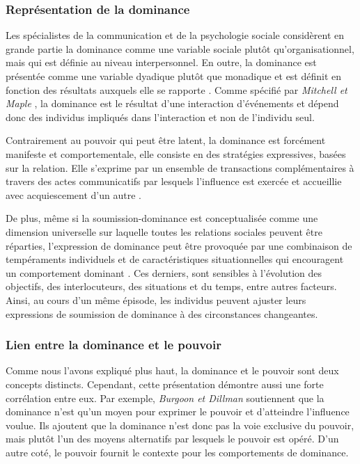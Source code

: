 		\subsubsection{Représentation de la dominance}
		
		Les spécialistes de la communication et de la psychologie sociale considèrent en grande partie la dominance comme une variable sociale plutôt qu'organisationnel, mais qui est définie au niveau interpersonnel. En outre, la dominance est présentée comme une variable dyadique plutôt que monadique et est définit en fonction des résultats auxquels elle se rapporte  \cite{burgoon1998nature,burgoon2006nonverbal}.
		Comme spécifié par \emph{Mitchell et Maple} \cite{smither1993authoritarianism}, la dominance est le résultat d'une interaction d'événements et dépend donc des individus impliqués dans l'interaction et non de l'individu seul.
		
	 	Contrairement au pouvoir qui peut être latent, la dominance est forcément manifeste et comportementale, elle consiste en des stratégies expressives, basées sur la relation. Elle s'exprime par un ensemble de transactions complémentaires à travers des actes communicatifs par lesquels l'influence est exercée et accueillie avec acquiescement d'un autre \cite{burgoon2000interactionist,millar1987relational}. 
		
		De plus, même si la soumission-dominance est conceptualisée comme une dimension universelle sur laquelle toutes les relations sociales peuvent être réparties, l'expression de dominance peut être provoquée par une combinaison de tempéraments individuels et de caractéristiques situationnelles	qui encouragent un comportement dominant \cite{burgoon2000interactionist}. Ces derniers, sont sensibles à l'évolution des objectifs, des interlocuteurs, des situations et du temps, entre autres facteurs.
		Ainsi, au cours d'un même épisode, les individus peuvent ajuster leurs expressions de soumission de dominance à des circonstances changeantes.
		
		\subsubsection{Lien entre la dominance et le pouvoir}
		Comme nous l'avons expliqué plus haut, la dominance et le pouvoir sont deux concepts distincts. Cependant, cette présentation démontre aussi une forte corrélation entre eux. 
		Par exemple, \emph{Burgoon et Dillman} \cite{burgoon1995interpersonal} soutiennent que la dominance n'est qu'un moyen pour exprimer le pouvoir et d'atteindre l'influence voulue.
		Ils ajoutent que la dominance n'est donc pas la voie exclusive du pouvoir, mais plutôt l'un des moyens alternatifs par lesquels le pouvoir est opéré. D'un autre coté, le pouvoir fournit le contexte pour les comportements de dominance. %
		
